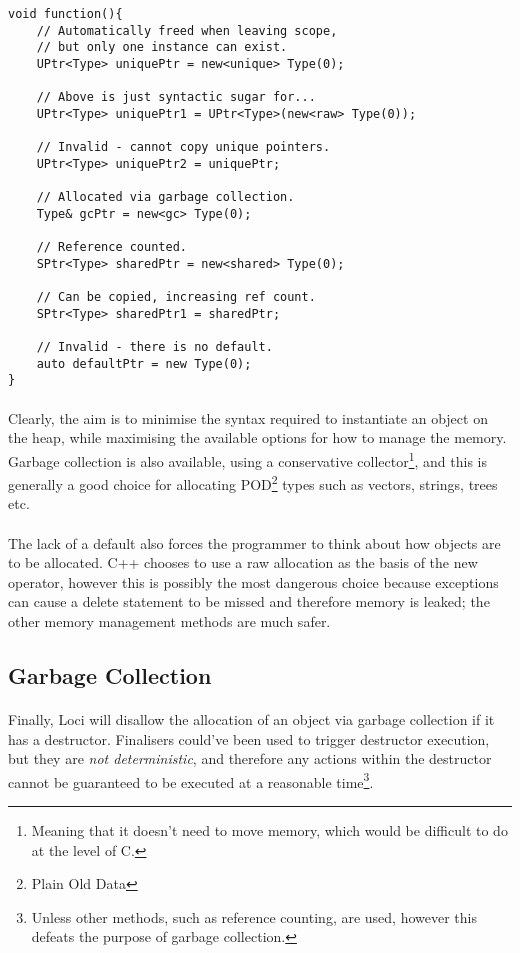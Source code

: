 \documentclass[12pt,twoside,notitlepage]{report}
\begin{document}
\small{
\begin{verbatim}
void function(){
    // Automatically freed when leaving scope,
    // but only one instance can exist.
    UPtr<Type> uniquePtr = new<unique> Type(0);
    
    // Above is just syntactic sugar for...
    UPtr<Type> uniquePtr1 = UPtr<Type>(new<raw> Type(0));
    
    // Invalid - cannot copy unique pointers.
    UPtr<Type> uniquePtr2 = uniquePtr;
    
    // Allocated via garbage collection.
    Type& gcPtr = new<gc> Type(0);
    
    // Reference counted.
    SPtr<Type> sharedPtr = new<shared> Type(0);
    
    // Can be copied, increasing ref count.
    SPtr<Type> sharedPtr1 = sharedPtr;
    
    // Invalid - there is no default.
    auto defaultPtr = new Type(0);
}
\end{verbatim}
}

\paragraph{}
Clearly, the aim is to minimise the syntax required to instantiate an object on the heap, while maximising the available options for how to manage the memory. Garbage collection is also available, using a conservative collector\footnote{Meaning that it doesn't need to move memory, which would be difficult to do at the level of C.}, and this is generally a good choice for allocating POD\footnote{Plain Old Data} types such as vectors, strings, trees etc.

\paragraph{}
The lack of a default also forces the programmer to think about how objects are to be allocated. C++ chooses to use a raw allocation as the basis of the new operator, however this is possibly the most dangerous choice because exceptions can cause a delete statement to be missed and therefore memory is leaked; the other memory management methods are much safer.

\subsection{Garbage Collection}

\paragraph{}
Finally, Loci will disallow the allocation of an object via garbage collection if it has a destructor. Finalisers could've been used to trigger destructor execution, but they are \emph{not deterministic}, and therefore any actions within the destructor cannot be guaranteed to be executed at a reasonable time\footnote{Unless other methods, such as reference counting, are used, however this defeats the purpose of garbage collection.}.
\end{document}
